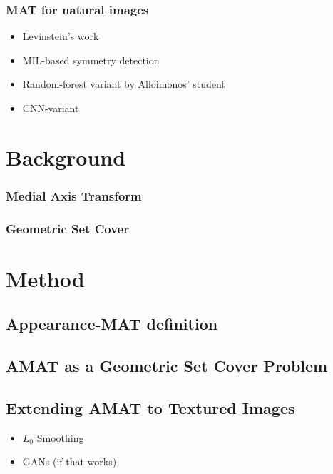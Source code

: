 \documentclass[10pt,twocolumn,letterpaper]{article}
\begin{document}
\subsubsection*{MAT for natural images}
\begin{itemize}
\item Levinstein's work
\item MIL-based symmetry detection
\item Random-forest variant by Alloimonos' student
\item CNN-variant 
\end{itemize}

\section{Background}\label{sec:background}
\subsubsection*{Medial Axis Transform}
\subsubsection*{Geometric Set Cover}

\section{Method}\label{sec:method}
\subsection{Appearance-MAT definition}\label{sec:amat}
\subsection{AMAT as a Geometric Set Cover Problem}
\subsection{Extending AMAT to Textured Images}
\begin{itemize}
\item $L_0$ Smoothing
\item GANs (if that works)
\end{itemize}
\end{document}
